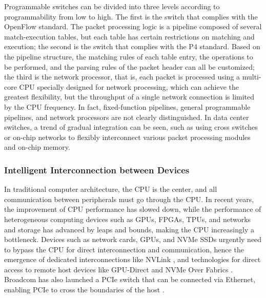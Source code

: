 Programmable switches can be divided into three levels according to programmability from low to high. The first is the switch that complies with the OpenFlow standard. The packet processing logic is a pipeline composed of several match-execution tables, but each table has certain restrictions on matching and execution; the second is the switch that complies with the P4 standard. Based on the pipeline structure, the matching rules of each table entry, the operations to be performed, and the parsing rules of the packet header can all be customized; the third is the network processor, that is, each packet is processed using a multi-core CPU specially designed for network processing, which can achieve the greatest flexibility, but the throughput of a single network connection is limited by the CPU frequency. In fact, fixed-function pipelines, general programmable pipelines, and network processors are not clearly distinguished. In data center switches, a trend of gradual integration can be seen, such as using cross switches or on-chip networks to flexibly interconnect various packet processing modules and on-chip memory.

\subsubsection{Intelligent Interconnection between Devices}

In traditional computer architecture, the CPU is the center, and all communication between peripherals must go through the CPU. In recent years, the improvement of CPU performance has slowed down, while the performance of heterogeneous computing devices such as GPUs, FPGAs, TPUs, and networks and storage has advanced by leaps and bounds, making the CPU increasingly a bottleneck. Devices such as network cards, GPUs, and NVMe SSDs urgently need to bypass the CPU for direct interconnection and communication, hence the emergence of dedicated interconnections like NVLink \cite{foley2017ultra}, and technologies for direct access to remote host devices like GPU-Direct \cite{gpu-direct} and NVMe Over Fabrics \cite{minturn2015nvm}. Broadcom has also launched a PCIe switch that can be connected via Ethernet, enabling PCIe to cross the boundaries of the host \cite{broadcom-expressfabric}.

